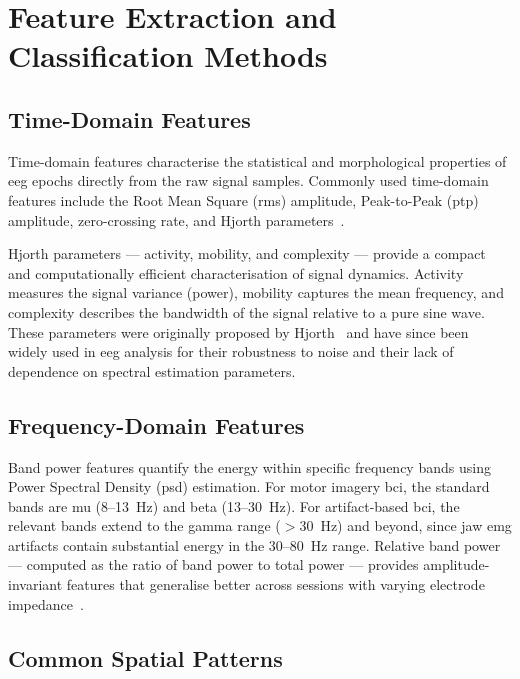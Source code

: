 \section{Feature Extraction and Classification Methods}
\label{sec:rw_features}

\subsection{Time-Domain Features}

Time-domain features characterise the statistical and morphological
properties of \acrshort{eeg} epochs directly from the raw signal
samples. Commonly used time-domain features include the Root Mean
Square (\acrshort{rms}) amplitude, Peak-to-Peak (\acrshort{ptp})
amplitude, zero-crossing rate, and Hjorth
parameters~\cite{hjorth1970eeg}.

Hjorth parameters — activity, mobility, and complexity — provide
a compact and computationally efficient characterisation of signal
dynamics. Activity measures the signal variance (power), mobility
captures the mean frequency, and complexity describes the bandwidth
of the signal relative to a pure sine wave. These parameters were
originally proposed by Hjorth~\cite{hjorth1970eeg} and have since
been widely used in \acrshort{eeg} analysis for their robustness
to noise and their lack of dependence on spectral estimation
parameters.

\subsection{Frequency-Domain Features}

Band power features quantify the energy within specific frequency
bands using Power Spectral Density (\acrshort{psd}) estimation.
For motor imagery \acrshort{bci}, the standard bands are mu
(8--13~Hz) and beta (13--30~Hz). For artifact-based \acrshort{bci},
the relevant bands extend to the gamma range ($>$30~Hz) and beyond,
since jaw \acrshort{emg} artifacts contain substantial energy in
the 30--80~Hz range. Relative band power — computed as the ratio
of band power to total power — provides amplitude-invariant features
that generalise better across sessions with varying electrode
impedance~\cite{lotte2007review}.

\subsection{Common Spatial Patterns}


